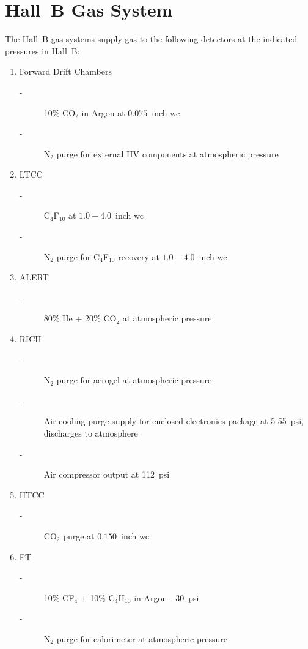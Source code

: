 \section{Hall~B Gas System}

The Hall~B gas systems supply gas to the following detectors at the indicated pressures 
in Hall~B:
\begin{enumerate}
\item Forward Drift Chambers 
\begin{description}
\item[-] 10\% CO$_2$ in Argon at $0.075$~inch wc
\item[-] N$_2$ purge for external HV components at atmospheric pressure
\end{description}
\item LTCC 
\begin{description}
\item[-] C$_4$F$_{10}$ at $1.0 - 4.0$~inch wc
\item[-] N$_2$ purge for C$_4$F$_{10}$ recovery at $1.0-4.0$~inch wc
\end{description}
\item ALERT
  \begin{description}
    \item[-] 80\% He + 20\% CO$_2$ at atmospheric pressure
\end{description}
\item RICH 
\begin{description}
\item[-] N$_2$ purge for aerogel at atmospheric pressure
\item[-] Air cooling purge supply for enclosed electronics package at 5-55~psi, discharges to atmosphere
\item[-] Air compressor output at 112~psi 
\end{description}
\item HTCC 
\begin{description}
\item[-] CO$_2$ purge at $0.150$~inch wc 
\end{description}
\item FT 
\begin{description}
\item[-] 10\% CF$_4$ + 10\% C$_4$H$_{10}$ in Argon - 30~psi
\item[-] N$_2$ purge for calorimeter at atmospheric pressure 
\end{description}
\end{enumerate}


